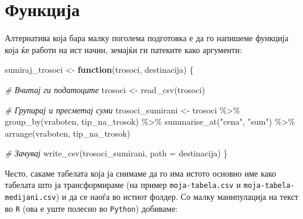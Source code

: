 \documentclass[
]{book}
\newenvironment{Shaded}{\begin{snugshade}}{\end{snugshade}}
\newcommand{\AttributeTok}[1]{\textcolor[rgb]{0.77,0.63,0.00}{#1}}
\newcommand{\CommentTok}[1]{\textcolor[rgb]{0.56,0.35,0.01}{\textit{#1}}}
\newcommand{\ControlFlowTok}[1]{\textcolor[rgb]{0.13,0.29,0.53}{\textbf{#1}}}
\newcommand{\FunctionTok}[1]{\textcolor[rgb]{0.00,0.00,0.00}{#1}}
\newcommand{\NormalTok}[1]{#1}
\newcommand{\OtherTok}[1]{\textcolor[rgb]{0.56,0.35,0.01}{#1}}
\newcommand{\SpecialCharTok}[1]{\textcolor[rgb]{0.00,0.00,0.00}{#1}}
\newcommand{\StringTok}[1]{\textcolor[rgb]{0.31,0.60,0.02}{#1}}
\begin{document}
\hypertarget{ux444ux443ux43dux43aux446ux438ux458ux430}{%
\section{Функција}\label{ux444ux443ux43dux43aux446ux438ux458ux430}}

Алтернатива која бара малку поголема подготовка е да го напишеме функција која ќе работи на ист начин, земајќи ги патеките како аргументи:

\begin{Shaded}
\begin{Highlighting}[]
\NormalTok{sumiraj\_trosoci }\OtherTok{\textless{}{-}} \ControlFlowTok{function}\NormalTok{(trosoci, destinacija) \{}
  
  \CommentTok{\# Вчитај ги податоците}
\NormalTok{  trosoci }\OtherTok{\textless{}{-}} \FunctionTok{read\_csv}\NormalTok{(trosoci)}
  
  \CommentTok{\# Групирај и пресметај суми}
\NormalTok{  trosoci\_sumirani }\OtherTok{\textless{}{-}}\NormalTok{ trosoci }\SpecialCharTok{\%\textgreater{}\%}
    \FunctionTok{group\_by}\NormalTok{(vraboten, tip\_na\_trosok) }\SpecialCharTok{\%\textgreater{}\%}
    \FunctionTok{summarise\_at}\NormalTok{(}\StringTok{"cena"}\NormalTok{, }\StringTok{"sum"}\NormalTok{) }\SpecialCharTok{\%\textgreater{}\%} 
  \FunctionTok{arrange}\NormalTok{(vraboten, tip\_na\_trosok)}
  
  \CommentTok{\# Зачувај}
  \FunctionTok{write\_csv}\NormalTok{(trosoci\_sumirani,}
            \AttributeTok{path =}\NormalTok{ destinacija)}
\NormalTok{\}}
\end{Highlighting}
\end{Shaded}

Често, сакаме табелата која ја снимаме да го има истото основно име како табелата што ја трансформираме (на пример \texttt{moja-tabela.csv} и \texttt{moja-tabela-medijani.csv}) и да се наоѓа во истиот фолдер. Со малку манипулација на текст во \texttt{R} (ова е уште полесно во \texttt{Python}) добиваме:
\end{document}
